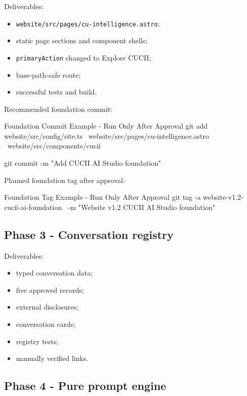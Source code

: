 \documentclass[11pt,letterpaper]{article}
\newcommand{\filepath}[1]{\texttt{#1}}
\begin{document}
Deliverables:

\begin{itemize}
    \item \filepath{website/src/pages/cu-intelligence.astro};
    \item static page sections and component shells;
    \item \texttt{primaryAction} changed to Explore CUCII;
    \item base-path-safe route;
    \item successful tests and build.
\end{itemize}

Recommended foundation commit:

\begin{commandbox}{Foundation Commit Example - Run Only After Approval}
git add website/src/config/site.ts \
        website/src/pages/cu-intelligence.astro \
        website/src/components/cucii

git commit -m "Add CUCII AI Studio foundation"
\end{commandbox}

Planned foundation tag after approval:

\begin{commandbox}{Foundation Tag Example - Run Only After Approval}
git tag -a website-v1.2-cucii-ai-foundation \
  -m "Website v1.2 CUCII AI Studio foundation"
\end{commandbox}

\subsection{Phase 3 - Conversation registry}

Deliverables:

\begin{itemize}
    \item typed conversation data;
    \item five approved records;
    \item external disclosures;
    \item conversation cards;
    \item registry tests;
    \item manually verified links.
\end{itemize}

\subsection{Phase 4 - Pure prompt engine}
\end{document}
